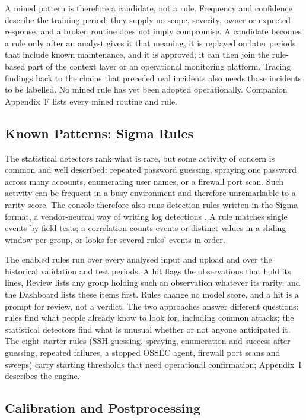 \documentclass[11pt,a4paper]{article}
\newcommand{\tok}[1]{\texttt{\detokenize{#1}}}
\begin{document}
A mined pattern is therefore a candidate, not a rule. Frequency and confidence describe the training period; they supply no scope, severity, owner or expected response, and a broken routine does not imply compromise. A candidate becomes a rule only after an analyst gives it that meaning, it is replayed on later periods that include known maintenance, and it is approved; it can then join the rule-based part of the context layer or an operational monitoring platform. Tracing findings back to the chains that preceded real incidents also needs those incidents to be labelled. No mined rule has yet been adopted operationally. Companion Appendix~F lists every mined routine and rule.

\subsection{Known Patterns: Sigma Rules}\label{sec:core-sigma}

The statistical detectors rank what is rare, but some activity of concern is common and well described: repeated password guessing, spraying one password across many accounts, enumerating user names, or a firewall port scan. Such activity can be frequent in a busy environment and therefore unremarkable to a rarity score. The console therefore also runs detection rules written in the Sigma format, a vendor-neutral way of writing log detections \cite{ref28}. A rule matches single events by field tests; a correlation counts events or distinct values in a sliding window per group, or looks for several rules' events in order.

The enabled rules run over every analysed input and upload and over the historical validation and test periods. A hit flags the observations that hold its lines, Review lists any group holding such an observation whatever its rarity, and the Dashboard lists these items first. Rules change no model score, and a hit is a prompt for review, not a verdict. The two approaches answer different questions: rules find what people already know to look for, including common attacks; the statistical detectors find what is unusual whether or not anyone anticipated it. The eight starter rules (SSH guessing, spraying, enumeration and success after guessing, repeated \tok{su} failures, a stopped OSSEC agent, firewall port scans and sweeps) carry starting thresholds that need operational confirmation; Appendix~I describes the engine.

\subsection{Calibration and Postprocessing}
\end{document}
